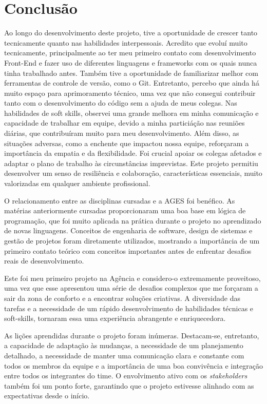 \section[Conclusão]{Conclusão}

 Ao longo do desenvolvimento deste projeto, tive a oportunidade de crescer tanto tecnicamente quanto nas habilidades interpessoais. Acredito que evoluí muito tecnicamente, principalmente ao ter meu primeiro contato com desenvolvimento Front-End e fazer uso de diferentes linguagens e frameworks com os quais nunca tinha trabalhado antes. Também tive a oportunidade de familiarizar melhor com ferramentas de controle de versão, como o Git. Entretanto, percebo que ainda há muito espaço para aprimoramento técnico, uma vez que não consegui contribuir tanto com o desenvolvimento do código sem a ajuda de meus colegas. Nas habilidades de soft skills, observei uma grande melhora em minha comunicação e capacidade de trabalhar em equipe, devido a minha particiáção nas reuniões diárias, que contribuíram muito para meu desenvolvimento. Além disso, as situações adversas, como a enchente que impactou nossa equipe, reforçaram a importância da empatia e da flexibilidade. Foi crucial apoiar os colegas afetados e adaptar o plano de trabalho às circunstâncias imprevistas. Este projeto permitiu desenvolver um senso de resiliência e colaboração, características essenciais, muito valorizadas em qualquer ambiente profissional.
 
 O relacionamento entre as disciplinas cursadas e a AGES foi benéfico. As matérias anteriormente cursadas proporcionaram uma boa base em lógica de programação, que foi muito aplicada na prática durante o projeto no aprendizado de novas linguagens. Conceitos de engenharia de software, design de sistemas e gestão de projetos foram diretamente utilizados, mostrando a importância de um primeiro contato teórico com conceitos importantes antes de enfrentar desafios reais de desenvolvimento.
 
Este foi meu primeiro projeto na Agência e considero-o extremamente proveitoso, uma vez que esse apresentou uma série de desafios complexos que me forçaram a sair da zona de conforto e a encontrar soluções criativas. A diversidade das tarefas e a necessidade de um rápido desenvolvimento de habilidades técnicas e soft-skills, tornaram essa uma experiência abrangente e enriquecedora.

As lições aprendidas durante o projeto foram inúmeras. Destacam-se, entretanto, a capacidade de adaptação às mudanças, a necessidade de um planejamento detalhado, a necessidade de manter uma comunicação clara e constante com todos os membros da equipe e a importância de uma boa convivência e integração entre todos os integrantes do time. O envolvimento ativo com os \textit{stakeholders} também foi um ponto forte, garantindo que o projeto estivesse alinhado com as expectativas desde o início.


